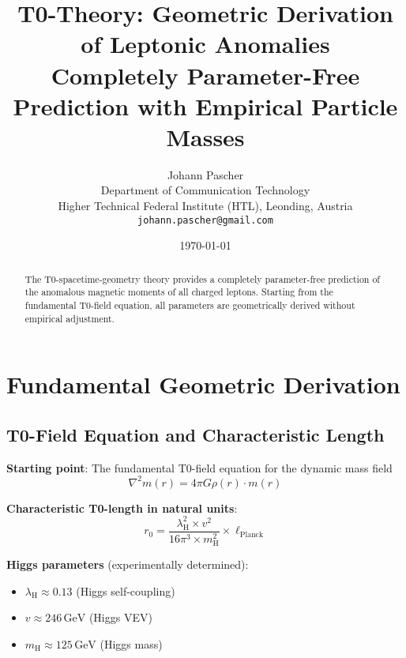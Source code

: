\documentclass[12pt,a4paper]{article}
\newcommand{\lambdaH}{\lambda_{\text{H}}}
\newcommand{\ellPlanck}{\ell_{\text{Planck}}}
\newcommand{\rzero}{r_0}
\begin{document}
	
	\title{T0-Theory: Geometric Derivation of Leptonic Anomalies \\
		\large Completely Parameter-Free Prediction with Empirical Particle Masses}
	\author{Johann Pascher\\
		Department of Communication Technology\\
		Higher Technical Federal Institute (HTL), Leonding, Austria\\
		\texttt{johann.pascher@gmail.com}}
	\date{\today}
	
	\maketitle
	
	\begin{abstract}
		The T0-spacetime-geometry theory provides a completely parameter-free prediction of the anomalous magnetic moments of all charged leptons. Starting from the fundamental T0-field equation, all parameters are geometrically derived without empirical adjustment.
	\end{abstract}
	
	\tableofcontents
	\newpage
	
	\section{Fundamental Geometric Derivation}
	
	\subsection{T0-Field Equation and Characteristic Length}
	
	\textbf{Starting point}: The fundamental T0-field equation for the dynamic mass field
	\begin{equation}
		\nabla^2 m(r) = 4\pi G \rho(r) \cdot m(r)
	\end{equation}
	
	\textbf{Characteristic T0-length in natural units}:
	\begin{equation}
		\rzero = \frac{\lambdaH^2 \times v^2}{16\pi^3 \times m_{\text{H}}^2} \times \ellPlanck
	\end{equation}
	
	\textbf{Higgs parameters} (experimentally determined):
	\begin{itemize}
		\item $\lambdaH \approx 0.13$ (Higgs self-coupling)
		\item $v \approx 246\,\text{GeV}$ (Higgs VEV)
		\item $m_{\text{H}} \approx 125\,\text{GeV}$ (Higgs mass)
	\end{itemize}
	
\end{document}
